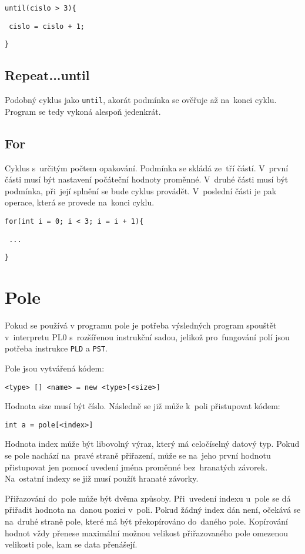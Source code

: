\documentclass[czech]{thesiskiv}
\begin{document}

\texttt{until(cislo > 3)\{}

\texttt{    cislo = cislo + 1;}

\texttt{\}}

\subsection{Repeat...until}
Podobný cyklus jako \texttt{until}, akorát podmínka se ověřuje až na~konci cyklu.
Program se tedy vykoná alespoň jedenkrát.

\subsection{For}
Cyklus s~určitým počtem opakování. Podmínka se skládá ze~tří částí.
V~první části musí být nastavení počáteční hodnoty proměnné.
V~druhé části musí být podmínka, při~její splnění se bude cyklus provádět.
V~poslední části je pak operace, která se provede na~konci cyklu.


\texttt{for(int i = 0; i < 3; i = i + 1)\{} 

\texttt{    ...}

\texttt{\}}
               
\section{Pole}

Pokud se používá v programu pole je potřeba výsledných program spouštět v~interpretu PL0 s~rozšířenou instrukční sadou, 
jelikož pro~fungování polí jsou potřeba instrukce \texttt{PLD} a \texttt{PST}.

Pole jsou vytvářená kódem:

\texttt{<type> [] <name> = new <type>[<size>]}

\noindent Hodnota size musí být číslo. Následně se již může k~poli přistupovat kódem:

\texttt{int a = pole[<index>]}

\noindent Hodnota index může být libovolný výraz, který má celočíselný datový typ. 
Pokud se pole nachází na~pravé straně přiřazení, může se na~jeho první hodnotu přistupovat jen pomocí uvedení jména proměnné bez~hranatých závorek. 
Na~ostatní indexy se již musí použít hranaté závorky. 


Přiřazování do~pole může být dvěma způsoby. Při~uvedení indexu u~pole se dá přiřadit 
hodnota na~danou pozici v~poli. Pokud žádný index dán není, očekává se na~druhé straně pole, 
které má být překopírováno do~daného pole. Kopírování hodnot vždy přenese maximální možnou 
velikost přiřazovaného pole omezenou velikosti pole, kam se data přenášejí.
\end{document}
